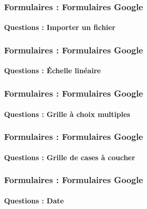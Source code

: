 \documentclass[xcolor=table]{beamer}
\begin{document}
\begin{frame}
\frametitle{Formulaires : Formulaires Google}
\framesubtitle{Questions : Importer un fichier}

\begin{center}

\end{center}

\end{frame}

\begin{frame}
\frametitle{Formulaires : Formulaires Google}
\framesubtitle{Questions : Échelle linéaire}

\begin{center}

\end{center}

\end{frame}

\begin{frame}
\frametitle{Formulaires : Formulaires Google}
\framesubtitle{Questions : Grille à choix multiples}

\begin{center}
	
\end{center}

\end{frame}

\begin{frame}
\frametitle{Formulaires : Formulaires Google}
\framesubtitle{Questions : Grille de cases à coucher}

\begin{center}
	
\end{center}

\end{frame}

\begin{frame}
\frametitle{Formulaires : Formulaires Google}
\framesubtitle{Questions : Date}

\begin{center}
	
\end{center}

\end{frame}
\end{document}
